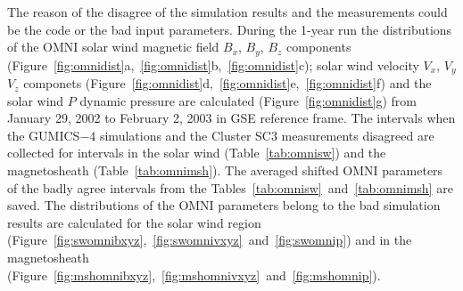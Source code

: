 \documentclass[linenumbers,draft]{agujournal}
\begin{document}

The reason of the disagree of the simulation results and the measurements could be the code or the bad input parameters. During the 1-year run the distributions of the OMNI solar wind magnetic field $B_{x}$, $B_{y}$, $B_{z}$ components (Figure~\ref{fig:omnidist}a,~\ref{fig:omnidist}b,~\ref{fig:omnidist}c); solar wind velocity $V_{x}$, $V_{y}$ $V_{z}$ componets (Figure~\ref{fig:omnidist}d,~\ref{fig:omnidist}e,~\ref{fig:omnidist}f) and the solar wind $P$ dynamic pressure are calculated (Figure~\ref{fig:omnidist}g) from January 29, 2002 to February 2, 2003 in GSE reference frame. The intervals when the GUMICS$-$4 simulations and the Cluster SC3 measurements disagreed are collected for intervals in the solar wind (Table~\ref{tab:omnisw}) and the magnetosheath (Table~\ref{tab:omnimsh}). The averaged shifted OMNI parameters of the badly agree intervals from the Tables~\ref{tab:omnisw}~and~\ref{tab:omnimsh} are saved. The distributions of the OMNI parameters belong to the bad simulation results are calculated for the solar wind region (Figure~\ref{fig:swomnibxyz},~\ref{fig:swomnivxyz}~and~\ref{fig:swomnip}) and in the magnetosheath (Figure~\ref{fig:mshomnibxyz},~\ref{fig:mshomnivxyz}~and~\ref{fig:mshomnip}). 
\end{document}
